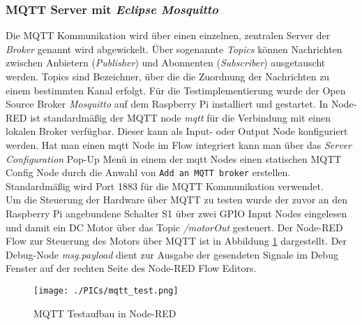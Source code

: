 \documentclass[BMR,Bachelor,ngerman]{twbook}%
\begin{document}
\subsubsection{MQTT Server mit \emph{Eclipse Mosquitto}}
Die \ac{MQTT} Kommunikation wird über einen einzelnen, zentralen Server der \emph{Broker} genannt wird abgewickelt. Über sogenannte \emph{Topics} können Nachrichten zwischen Anbietern (\emph{Publisher}) und Abonnenten (\emph{Subscriber}) ausgetauscht werden. Topics sind Bezeichner, über die die Zuordnung der Nachrichten zu einem bestimmten Kanal erfolgt. Für die Testimplementierung wurde der Open Source Broker \emph{Mosquitto} \cite{mosquitto2018} auf dem Raspberry Pi installiert und gestartet. In Node-RED ist standardmäßig der \ac{MQTT} node \emph{mqtt} für die Verbindung mit einen lokalen Broker verfügbar. Dieser kann als Input- oder Output Node konfiguriert werden. Hat man einen mqtt Node im Flow integriert kann man über das \emph{Server Configuration} Pop-Up Menü in einem der mqtt Nodes einen statischen MQTT Config Node durch die Anwahl von \verb+Add an MQTT broker+ erstellen. Standardmäßig wird Port 1883 für die \ac{MQTT} Kommunikation verwendet.\\\newline
Um die Steuerung der Hardware über \ac{MQTT} zu testen wurde der zuvor an den Raspberry Pi angebundene Schalter S1 über zwei \ac{GPIO} Input Nodes eingelesen und damit ein DC Motor über das Topic \emph{/motorOut} gesteuert. Der Node-RED Flow zur Steuerung des Motors über \ac{MQTT} ist in Abbildung \ref{fig:test_mqtt} dargestellt. Der Debug-Node \emph{msg.payload} dient zur Ausgabe der gesendeten Signale im Debug Fenster auf der rechten Seite des Node-RED Flow Editors.
%
\begin{figure}[!htbp]
\centering
\texttt{[image: ./PICs/mqtt\_test.png]}
\caption{MQTT Testaufbau in Node-RED}\label{fig:test_mqtt}
\end{figure}
%
\end{document}
